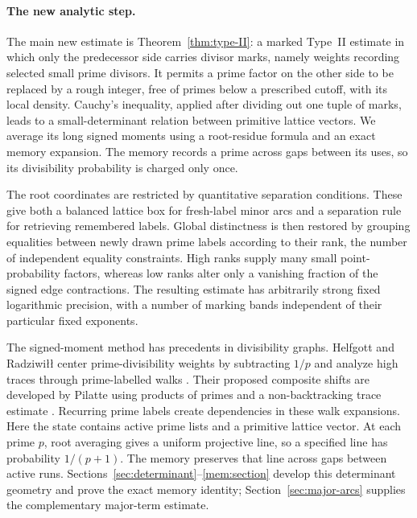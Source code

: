 \paragraph{The new analytic step.}
The main new estimate is Theorem~\ref{thm:type-II}: a marked
Type~II estimate in which only the predecessor side carries
divisor marks, namely weights recording selected small prime divisors.
It permits a prime factor on the other side to be
replaced by a rough integer, free of primes below a prescribed cutoff,
with its local density. Cauchy's
inequality, applied after dividing out one tuple of marks, leads
to a small-determinant relation between primitive lattice vectors.
We average its long signed moments using a root-residue formula
and an exact memory expansion.  The memory records a prime across
gaps between its uses, so its divisibility probability is charged
only once.

The root coordinates are restricted by quantitative separation
conditions. These give both a balanced lattice
box for fresh-label minor arcs and a separation rule for retrieving
remembered labels. Global distinctness is then restored by grouping
equalities between newly drawn prime labels according to their rank,
the number of independent equality constraints. High ranks supply
many small point-probability factors, whereas low ranks
alter only a vanishing fraction of the signed edge contractions.
The resulting estimate has arbitrarily strong fixed logarithmic
precision, with a number of marking bands independent of their
particular fixed exponents.

The signed-moment method has precedents in divisibility graphs.
Helfgott and Radziwi\l\l{} center prime-divisibility weights by
subtracting $1/p$ and analyze high traces through prime-labelled
walks \cite[Sections~1.3, 1.5 and~5]{HelfgottRadziwill2021}.
Their proposed composite shifts \cite[Section~9.1]{HelfgottRadziwill2021}
are developed by Pilatte using products of primes and a
non-backtracking trace estimate
\cite[Definition~3.2 and Proposition~5.3]{Pilatte2026}.
Recurring prime labels create dependencies in these walk expansions.
Here the state contains active prime lists and a primitive lattice
vector. At each prime $p$, root averaging gives a uniform projective
line, so a specified line has probability $1/(p+1)$. The memory
preserves that line across gaps between active runs.
Sections~\ref{sec:determinant}--\ref{mem:section}
develop this determinant geometry and prove the exact memory identity;
Section~\ref{sec:major-arcs} supplies the complementary major-term
estimate.

